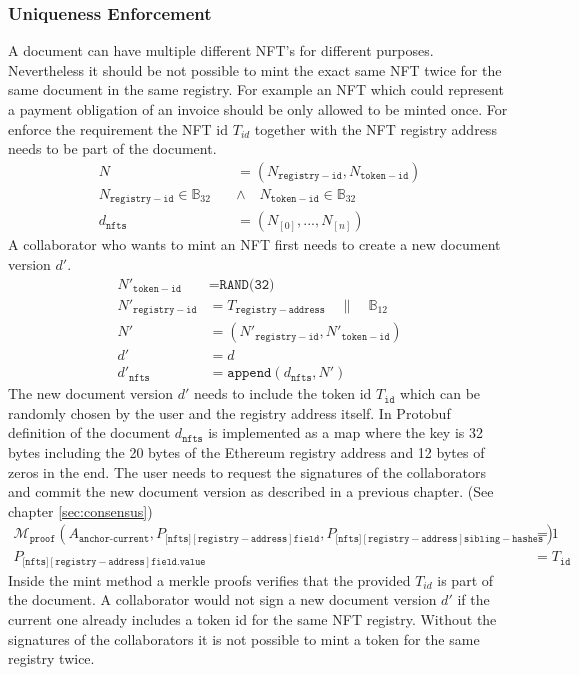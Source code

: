 \subsubsection{Uniqueness Enforcement}
A document can have multiple different NFT's for different purposes. Nevertheless it should be not possible to mint the exact same NFT twice for the same document in the same registry. For example an NFT which could represent a payment obligation of an invoice should be only allowed to be minted once. For enforce the requirement the NFT id $T_{id}$ together with the NFT registry address needs to be part of the document. 
\begin{equation}
\begin{split}
N & = (N_{\mathtt{registry-id}}, N_{\mathtt{token-id}}) \\
N_{\mathtt{registry-id}} \in \mathbb{B}_{32}  \quad &\land \quad N_{\mathtt{token-id}} \in \mathbb{B}_{32}  \\
d_{\mathtt{nfts}}& = (N_{[0]},...,N_{[n]})
\end{split}
\end{equation}
A collaborator who wants to mint an NFT first needs to create a new document version $d'$.
\begin{equation}
\begin{split}
N'_{\mathtt{token-id}} & = \texttt{RAND(32)}\\
N'_{\mathtt{registry-id}} & = T_{\mathtt{registry-address}} \quad \| \quad \mathbb{B}_{12} \\
N'  & = (N'_{\mathtt{registry-id}},N'_{\mathtt{token-id}}) \\
d' & = d \\
d'_{\mathtt{nfts}} & = \texttt{append}(d_{\mathtt{nfts}},N')
\end{split}
\end{equation}
The new document version $d'$ needs to include the token id $T_{\mathtt{id}}$ which can be randomly chosen by
the user and the registry address itself. In Protobuf definition of the document $d_{\mathtt{nfts}}$ is implemented as a map where the key is 32 bytes including the 20 bytes of the Ethereum registry address and 12 bytes of zeros in the end. The user needs to request the signatures of the collaborators and commit the new document version as described in a previous chapter. (See chapter \ref{sec:consensus})
\begin{equation}
\begin{split}
\mathcal{M}_{\texttt{proof}}(A_{\texttt{anchor-current}} ,P_{[\mathtt{nfts]{[registry-address]}}\mathtt{field}},P_{[\mathtt{nfts]{[registry-address]}}\mathtt{sibling-hashes}}) &= 1 \\
P_{[\mathtt{nfts]{[registry-address]}}\mathtt{field.value}} &= T_{\mathtt{id}}
\end{split}
\end{equation}
Inside the mint method a merkle proofs verifies that the provided $T_{id}$ is part of the document. A collaborator would not sign a new document version $d'$ if the current one already includes a token id for the same NFT registry. Without the signatures of the collaborators it is not possible to mint a token for the same registry twice.
